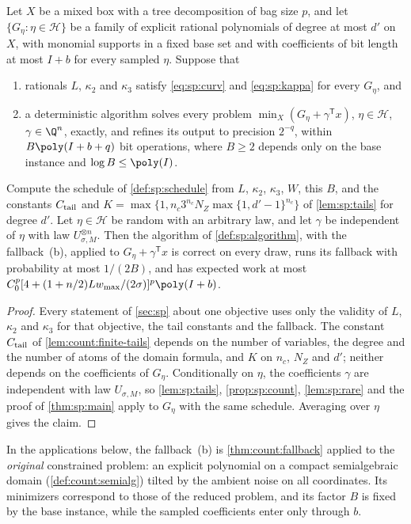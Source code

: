 \begin{lemma}\label{lem:con:uniform}
Let $X$ be a mixed box with a tree decomposition of bag size $p$, and let
$\{G_\eta:\eta\in\mathcal H\}$ be a family of explicit rational polynomials
of degree at most $d'$ on $X$, with monomial supports in a fixed base set and
with coefficients of bit length at most $I+b$ for every sampled $\eta$.
Suppose that
\begin{enumerate}[label=(\alph*)]
\item rationals $L$, $\kappa_2$ and $\kappa_3$ satisfy \eqref{eq:sp:curv} and
\eqref{eq:sp:kappa} for every $G_\eta$, and
\item a deterministic algorithm solves every problem
$\min_X(G_\eta+\gamma^{\mathsf T}x)$, $\eta\in\mathcal H$, $\gamma\in\Q^n$,
exactly, and refines its output to precision $2^{-q}$, within
$B\poly(I+b+q)$ bit operations, where $B\ge2$ depends only on the base
instance and $\log B\le\poly(I)$.
\end{enumerate}
Compute the schedule of \cref{def:sp:schedule} from $L$, $\kappa_2$,
$\kappa_3$, $W$, this $B$, and the constants $C_{\rm tail}$ and
$K=\max\{1,n_c3^{n_c}N_Z\max\{1,d'-1\}^{n_c}\}$ of \cref{lem:sp:tails} for
degree $d'$. Let $\eta\in\mathcal H$ be random with an arbitrary law, and let
$\gamma$ be independent of $\eta$ with law $U_{\sigma,M}^{\otimes n}$. Then the
algorithm of \cref{def:sp:algorithm}, with the fallback~(b), applied to
$G_\eta+\gamma^{\mathsf T}x$ is correct on every draw, runs its fallback with
probability at most $1/(2B)$, and has expected work at most
$C_0^p[4+(1+n/2)Lw_{\max}/(2\sigma)]^p\poly(I+b)$.
\end{lemma}

\begin{proof}
Every statement of \cref{sec:sp} about one objective uses only the validity
of $L$, $\kappa_2$ and $\kappa_3$ for that objective, the tail constants and
the fallback. The constant $C_{\rm tail}$ of \cref{lem:count:finite-tails}
depends on the number of variables, the degree and the number of atoms of
the domain formula, and $K$ on $n_c$, $N_Z$ and $d'$; neither depends on the
coefficients of $G_\eta$. Conditionally on $\eta$, the coefficients $\gamma$
are independent with law $U_{\sigma,M}$, so \cref{lem:sp:tails},
\cref{prop:sp:count}, \cref{lem:sp:rare} and the proof of \cref{thm:sp:main}
apply to $G_\eta$ with the same schedule. Averaging over $\eta$ gives the
claim.
\end{proof}

In the applications below, the fallback~(b) is \cref{thm:count:fallback}
applied to the \emph{original} constrained problem: an explicit polynomial
on a compact semialgebraic domain (\cref{def:count:semialg}) tilted by the
ambient noise on all coordinates. Its minimizers correspond to those of the
reduced problem, and its factor $B$ is fixed by the base instance, while the
sampled coefficients enter only through $b$.

